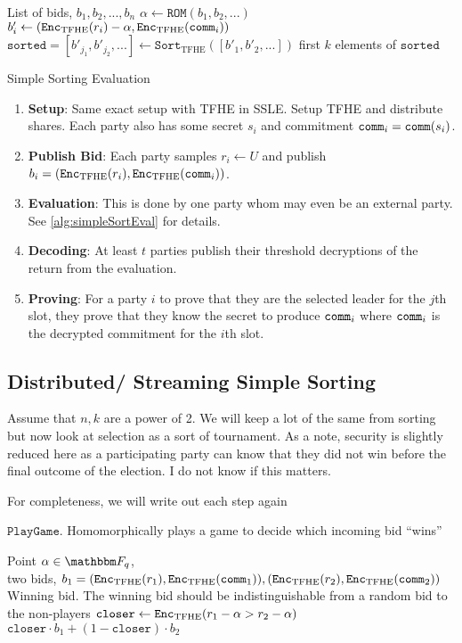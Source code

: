 \documentclass[11pt]{article}
\begin{document}
\begin{algorithm}
	\begin{algorithmic}
    \Require List of bids, $b_1, b_2, ..., b_n$
		\State $\alpha \gets \texttt{ROM}(b_1, b_2, ...)$
		\State $b'_i \gets (\texttt{Enc}_{\mathrm{TFHE}}(r_i) - \alpha, \texttt{Enc}_{\mathrm{TFHE}}(\texttt{comm}_i))$
		\EndFor
		\State $\texttt{sorted} = [b'_{j_1}, b'_{j_2}, ...] \gets \texttt{Sort}_{\mathrm{TFHE}}([b'_1, b'_2, ...])$
		\State \Return first $k$ elements of $\texttt{sorted}$
	\end{algorithmic}
	\caption{Simple Sorting Evaluation}
	\label{alg:simpleSortEval}
\end{algorithm}


\begin{enumerate}
	\item \textbf{Setup}: Same exact setup with TFHE in SSLE. Setup TFHE and distribute shares.
	      Each party also has some secret $s_i$ and commitment $\texttt{comm}_i = \texttt{comm}(s_i)$.
	\item \textbf{Publish Bid}: Each party samples $r_i \leftarrow U$ and publish $b_i = (\texttt{Enc}_{\mathrm{TFHE}}(r_i), \texttt{Enc}_{\mathrm{TFHE}}(\texttt{comm}_i))$.
	\item \textbf{Evaluation}: This is done by one party whom may even be an external party. See \cref{alg:simpleSortEval} for details.
	\item \textbf{Decoding}: At least $t$ parties publish their threshold decryptions of the return from the evaluation.
	\item \textbf{Proving}: For a party $i$ to prove that they are the selected leader for the $j$th slot, they prove that they know the secret to produce $\texttt{comm}_i$
	      where $\texttt{comm}_i$ is the decrypted commitment for the $i$th slot.
\end{enumerate}

\subsection{Distributed/ Streaming Simple Sorting}
Assume that $n, k$ are a power of 2. We will keep a lot of the same from sorting
but now look at selection as a sort of tournament. As a note, security is slightly reduced here as
a participating party can know that they did not win before the final outcome of the election. I do not know if this matters.

For completeness, we will write out each step again


\begin{algorithm}
	\caption{$\texttt{PlayGame}$. Homomorphically plays a game to decide which incoming bid ``wins''}
	\label{alg:playGame}
	\begin{algorithmic}
		\Require Point $\alpha \in \F_q$, \\two bids, $b_1 = (\texttt{Enc}_{\mathrm{TFHE}}(r_1), \texttt{Enc}_{\mathrm{TFHE}}(\texttt{comm}_1)), (\texttt{Enc}_{\mathrm{TFHE}}(r_2), \texttt{Enc}_{\mathrm{TFHE}}(\texttt{comm}_2))$
		\Ensure Winning bid. The winning bid should be indistinguishable from a random bid to the non-players
		\State $\texttt{closer} \gets \texttt{Enc}_{\mathrm{TFHE}}(r_1 - \alpha > r_2 - \alpha)$
		\State \Return $\texttt{closer} \cdot b_1 + (1 - \texttt{closer}) \cdot b_2$
	\end{algorithmic}
\end{algorithm}
\end{document}
